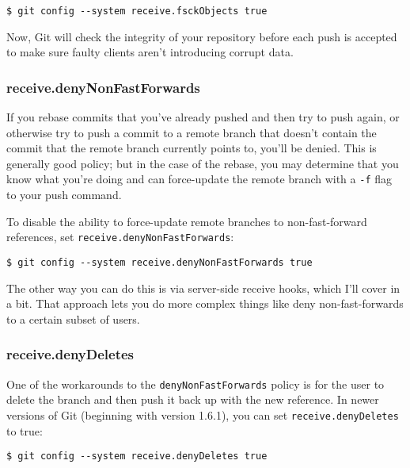 \documentclass[a4paper]{book}
\begin{document}
\begin{shaded}\begin{verbatim}
$ git config --system receive.fsckObjects true
\end{verbatim}\end{shaded}

Now, Git will check the integrity of your repository before each push is accepted to make sure faulty clients aren't introducing corrupt data.

\subsubsection{receive.denyNonFastForwards}

If you rebase commits that you've already pushed and then try to push again, or otherwise try to push a commit to a remote branch that doesn't contain the commit that the remote branch currently points to, you'll be denied. This is generally good policy; but in the case of the rebase, you may determine that you know what you're doing and can force-update the remote branch with a \texttt{-f} flag to your push command.

To disable the ability to force-update remote branches to non-fast-forward references, set \texttt{receive.denyNonFastForwards}:

\begin{shaded}\begin{verbatim}
$ git config --system receive.denyNonFastForwards true
\end{verbatim}\end{shaded}

The other way you can do this is via server-side receive hooks, which I'll cover in a bit. That approach lets you do more complex things like deny non-fast-forwards to a certain subset of users.

\subsubsection{receive.denyDeletes}

One of the workarounds to the \texttt{denyNonFastForwards} policy is for the user to delete the branch and then push it back up with the new reference. In newer versions of Git (beginning with version 1.6.1), you can set \texttt{receive.denyDeletes} to true:

\begin{shaded}\begin{verbatim}
$ git config --system receive.denyDeletes true
\end{verbatim}\end{shaded}
\end{document}
